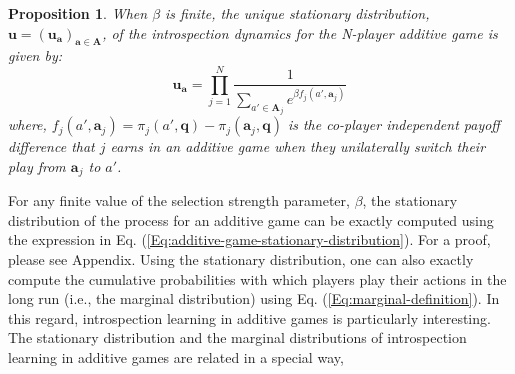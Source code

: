 \documentclass[11pt]{article}
\theoremstyle{plainCl1}
\newtheorem{Prop}{Proposition}
\theoremstyle{plainCl2}
\newcommand{\A}{\mathbf{A}}
\newcommand{\abf}{\mathbf{a}}
\newcommand{\qbf}{\mathbf{q}}
\newcommand{\ubf}{\mathbf{u}}
\begin{document}
 \begin{Prop}
When $\beta$ is finite, the unique stationary distribution, $\ubf = (\ubf_\abf)_{\abf \in \A}$, of the introspection dynamics for the N-player additive game is given by: 
\begin{equation}
\ubf_\abf = \prod_{j=1}^N \frac{1}{\displaystyle \sum_{a' \in \A_j} e^{\beta f_j(a', \abf_j)}} 
\label{Eq:additive-game-stationary-distribution}
\end{equation}
where, $f_j(a', \abf_j) = \pi_j(a', \qbf) - \pi_j(\abf_j, \qbf)$ is the co-player independent payoff difference that $j$  earns in an additive game when they unilaterally switch their play from $\abf_j$  to $a'$.
\label{Th:additive-games-stationary-dist}
\end{Prop}
\noindent For any finite value of the selection strength parameter, $\beta$, the stationary distribution of the process for an additive game can be exactly computed using the expression in Eq. (\ref{Eq:additive-game-stationary-distribution}). For a proof, please see Appendix. Using the stationary distribution, one can also exactly compute the cumulative probabilities with which players play their actions in the long run (i.e., the marginal distribution) using Eq. (\ref{Eq:marginal-definition}). In this regard, introspection learning in additive games is particularly interesting. The stationary distribution and the marginal distributions of introspection learning in additive games are related in a special way, 
\end{document}
